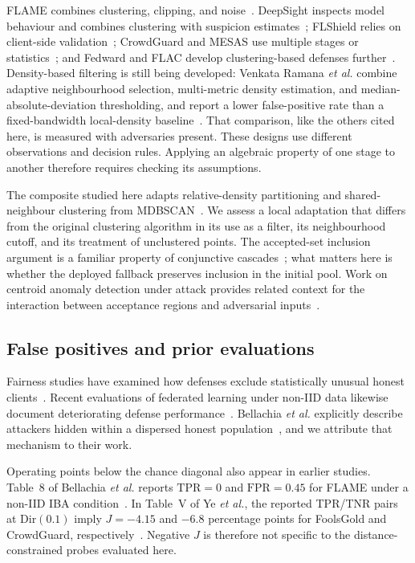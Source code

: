 \documentclass[journal]{IEEEtran}
\begin{document}
FLAME combines clustering, clipping, and noise~\cite{nguyen2022flame}. DeepSight inspects model behaviour and combines clustering with suspicion estimates~\cite{rieger2022deepsight}; FLShield relies on client-side validation~\cite{kabir2023flshield}; CrowdGuard and MESAS use multiple stages or statistics~\cite{rieger2024crowdguard,krauss2023mesas}; and Fedward and FLAC develop clustering-based defenses further~\cite{chen2023fedward,yuan2025flac}. Density-based filtering is still being developed: Venkata Ramana \emph{et al.} combine adaptive neighbourhood selection, multi-metric density estimation, and median-absolute-deviation thresholding, and report a lower false-positive rate than a fixed-bandwidth local-density baseline~\cite{ramana2026alldd}. That comparison, like the others cited here, is measured with adversaries present. These designs use different observations and decision rules. Applying an algebraic property of one stage to another therefore requires checking its assumptions.

The composite studied here adapts relative-density partitioning and shared-neighbour clustering from MDBSCAN~\cite{qian2024mdbscan}. We assess a local adaptation that differs from the original clustering algorithm in its use as a filter, its neighbourhood cutoff, and its treatment of unclustered points. The accepted-set inclusion argument is a familiar property of conjunctive cascades~\cite{viola2004cascade}; what matters here is whether the deployed fallback preserves inclusion in the initial pool. Work on centroid anomaly detection under attack provides related context for the interaction between acceptance regions and adversarial inputs~\cite{kloft2012centroid}.

\subsection{False positives and prior evaluations}
Fairness studies have examined how defenses exclude statistically unusual honest clients~\cite{singh2023fair,touat2023bias,ajibuwa2025fairness}. Recent evaluations of federated learning under non-IID data likewise document deteriorating defense performance~\cite{li2025heterogeneity,ye2025illusion,zhang2025flpoison}. Bellachia \emph{et al.} explicitly describe attackers hidden within a dispersed honest population~\cite{bellachia2026sok}, and we attribute that mechanism to their work.

Operating points below the chance diagonal also appear in earlier studies. Table~8 of Bellachia \emph{et al.} reports $\mathrm{TPR}=0$ and $\mathrm{FPR}=0.45$ for FLAME under a non-IID IBA condition~\cite{bellachia2026sok}. In Table~V of Ye \emph{et al.}, the reported TPR/TNR pairs at $\mathrm{Dir}(0.1)$ imply $J=-4.15$ and $-6.8$ percentage points for FoolsGold and CrowdGuard, respectively~\cite{ye2025illusion}. Negative $J$ is therefore not specific to the distance-constrained probes evaluated here.
\end{document}
